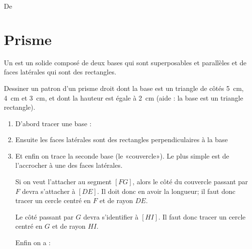 

De \cite{NRHooXFvgpp5}

\section{Prisme}

\begin{definition}
    Un  est un solide composé de deux bases qui sont superposables et parallèles et de faces latérales qui sont des rectangles.
\end{definition}


\begin{example}
    Dessiner un patron d'un prisme droit dont la base est un triangle de côtés \SI{5}{\centi\meter}, \SI{4}{\centi\meter} et \SI{3}{\centi\meter}, et dont la hauteur est égale à \SI{2}{\centi\meter} (aide : la base est un triangle rectangle).

    \begin{enumerate}
        \item
            D'abord tracer une base :


\begin{center}
   
\end{center}
\item
    Ensuite les faces latérales sont des rectangles perpendiculaires à la base
\begin{center}
   
\end{center}
\item
    Et enfin on trace la seconde base (le «couvercle»). Le plus simple est de l'accrocher à une des faces latérales.

    Si on veut l'attacher au segment \( [FG]\), alors le côté du couvercle passant par \( F\) devra s'attacher à \( [DE]\). Il doit donc en avoir la longueur; il faut donc tracer un cercle centré en \( F\) et de rayon \( DE\).

    Le côté passant par \( G\) devra s'identifier à \( [HI]\). Il faut donc tracer un cercle centré en \( G\) et de rayon \( HI\).

\begin{center}
   
\end{center}

Enfin on a :

\begin{center}

\end{center}
    \end{enumerate}
\end{example}


